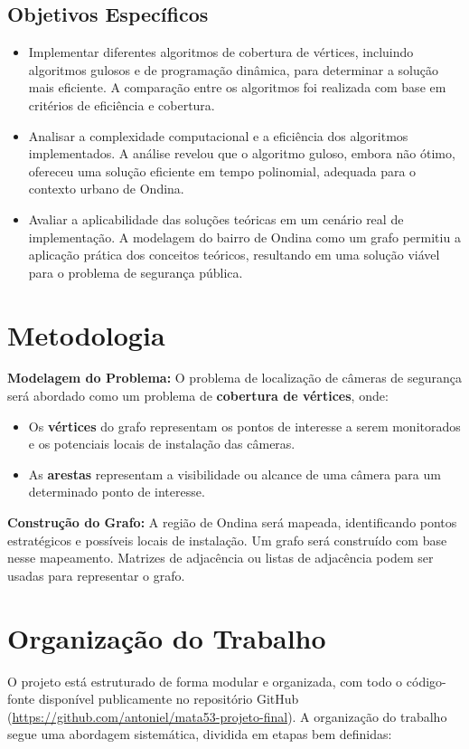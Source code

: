\documentclass[12pt, a4paper]{report}
\begin{document}
\subsection{Objetivos Específicos}
\begin{itemize}
    \item Implementar diferentes algoritmos de cobertura de vértices, incluindo algoritmos gulosos e de programação dinâmica, para determinar a solução mais eficiente. A comparação entre os algoritmos foi realizada com base em critérios de eficiência e cobertura.
    \item Analisar a complexidade computacional e a eficiência dos algoritmos implementados. A análise revelou que o algoritmo guloso, embora não ótimo, ofereceu uma solução eficiente em tempo polinomial, adequada para o contexto urbano de Ondina.
    \item Avaliar a aplicabilidade das soluções teóricas em um cenário real de implementação. A modelagem do bairro de Ondina como um grafo permitiu a aplicação prática dos conceitos teóricos, resultando em uma solução viável para o problema de segurança pública.
\end{itemize}

\section{Metodologia}
\textbf{Modelagem do Problema:} O problema de localização de câmeras de segurança será abordado como um problema de \textbf{cobertura de vértices}, onde:
\begin{itemize}
    \item Os \textbf{vértices} do grafo representam os pontos de interesse a serem monitorados e os potenciais locais de instalação das câmeras.
    \item As \textbf{arestas} representam a visibilidade ou alcance de uma câmera para um determinado ponto de interesse.
\end{itemize}

\textbf{Construção do Grafo:} A região de Ondina será mapeada, identificando pontos estratégicos e possíveis locais de instalação. Um grafo será construído com base nesse mapeamento. Matrizes de adjacência ou listas de adjacência podem ser usadas para representar o grafo.

\section{Organização do Trabalho}
O projeto está estruturado de forma modular e organizada, com todo o código-fonte disponível publicamente no repositório GitHub (\url{https://github.com/antoniel/mata53-projeto-final}). A organização do trabalho segue uma abordagem sistemática, dividida em etapas bem definidas:
\end{document}
